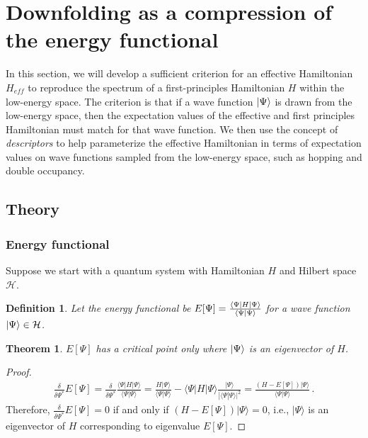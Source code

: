 \newtheorem{theorem}{Theorem}
\newtheorem{definition}{Definition}
\newtheorem{lemma}{Lemma}


\section{Downfolding as a compression of the energy functional}
\label{sec:theory}

In this section, we will develop a sufficient criterion for an effective Hamiltonian $H_{eff}$ to reproduce the spectrum of a first-principles Hamiltonian $H$ within the low-energy space. 
The criterion is that if a wave function $\ket{\Psi}$ is drawn from the low-energy space, then the expectation values of the effective and first principles Hamiltonian must match for that wave function.
We then use the concept of \textit{descriptors} to help parameterize the effective Hamiltonian in terms of expectation values on wave functions sampled from the low-energy space, such as hopping and double occupancy.

\subsection{Theory} 

\subsubsection{Energy functional}
Suppose we start with a quantum system with Hamiltonian $H$ and Hilbert space ${\mathcal H}$.

\begin{definition}
Let the energy functional be $E[\Psi] = \frac{\bra{\Psi}H\ket{\Psi}}{\braket{\Psi|\Psi}}$ for a wave function $\ket{\Psi} \in {\mathcal H}$.
\end{definition}


\begin{theorem}
\label{theorem:criticalpoint}
$E[\Psi]$ has a critical point only where $\ket{\Psi}$ is an eigenvector of $H$. 
\end{theorem}
\begin{proof}
\begin{eqnarray}
\frac{\delta }{\delta \Psi^*}  E[\Psi] = \frac{\delta}{\delta \Psi^*}\frac{\langle \Psi |H|\Psi\rangle}{\langle \Psi |\Psi\rangle} = \frac{H|\Psi\rangle}{\langle \Psi |\Psi\rangle} - \langle \Psi |H|\Psi\rangle \frac{|\Psi \rangle}{|\langle \Psi | \Psi\rangle|^2} =\frac{ (H-E[\Psi])|\Psi\rangle }{\langle\Psi|\Psi\rangle}\,.
\end{eqnarray}
Therefore, 
$\frac{\delta }{\delta \Psi^*}  E[\Psi] = 0$ if and only if $(H-E[\Psi])|\Psi\rangle =0$, i.e., $|\Psi\rangle$ is an eigenvector of $H$ corresponding to eigenvalue $E[\Psi]$.  
\end{proof}

